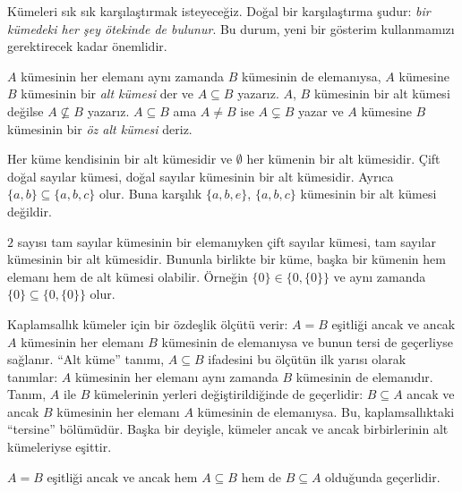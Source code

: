 \documentclass[../../../include/open-logic-section]{subfiles}
\begin{document}

\begin{explain}
Kümeleri sık sık karşılaştırmak isteyeceğiz. Doğal bir karşılaştırma şudur:
\emph{bir kümedeki her şey ötekinde de bulunur}. Bu durum,
yeni bir gösterim kullanmamızı gerektirecek kadar önemlidir.
\end{explain}

\begin{defn}
$A$ kümesinin her elemanı aynı zamanda $B$ kümesinin de elemanıysa, $A$
kümesine $B$ kümesinin bir \emph{alt kümesi} der ve $A \subseteq B$ yazarız.
$A$, $B$ kümesinin bir alt kümesi değilse $A \not\subseteq B$ yazarız.
$A \subseteq B$ ama $A \neq B$ ise $A \subsetneq B$ yazar ve $A$ kümesine
$B$ kümesinin bir \emph{öz alt kümesi} deriz.
\end{defn}

\begin{ex}
Her küme kendisinin bir alt kümesidir ve $\emptyset$ her kümenin bir
alt kümesidir. Çift doğal sayılar kümesi, doğal sayılar kümesinin bir
alt kümesidir. Ayrıca $\{ a, b \} \subseteq \{ a, b, c \}$ olur. Buna karşılık
$\{ a, b, e \}$, $\{ a, b, c \}$ kümesinin bir alt kümesi değildir.
\end{ex}

\begin{ex}
$2$ sayısı tam sayılar kümesinin bir elemanıyken çift sayılar kümesi, tam
sayılar kümesinin bir alt kümesidir. Bununla birlikte bir küme, başka bir
kümenin hem elemanı hem de alt kümesi olabilir.
Örneğin $\{0\} \in \{0, \{0\}\}$ ve aynı zamanda
$\{0\} \subseteq \{0, \{0\}\}$ olur.
\end{ex}

Kaplamsallık kümeler için bir özdeşlik ölçütü verir: $A = B$ eşitliği ancak ve
ancak $A$ kümesinin her elemanı $B$ kümesinin de elemanıysa ve bunun tersi de
geçerliyse sağlanır. ``Alt küme'' tanımı, $A \subseteq B$ ifadesini bu ölçütün
ilk yarısı olarak tanımlar: $A$ kümesinin her elemanı aynı zamanda $B$
kümesinin de elemanıdır. Tanım, $A$ ile $B$ kümelerinin yerleri
değiştirildiğinde de geçerlidir: $B \subseteq A$ ancak ve ancak $B$ kümesinin
her elemanı $A$ kümesinin de elemanıysa. Bu, kaplamsallıktaki ``tersine''
bölümüdür. Başka bir deyişle, kümeler ancak ve ancak birbirlerinin alt
kümeleriyse eşittir.

\begin{prop}
$A = B$ eşitliği ancak ve ancak hem $A \subseteq B$ hem de $B \subseteq A$
olduğunda geçerlidir.
\end{prop}
\end{document}
